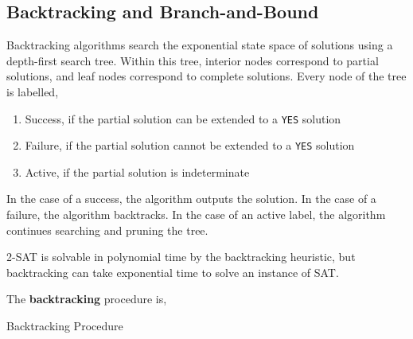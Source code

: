 \subsection{Backtracking and Branch-and-Bound}
Backtracking algorithms search the exponential state space of solutions using a depth-first search tree. Within this tree, interior nodes correspond to partial solutions, and leaf nodes correspond to complete solutions. Every node of the tree is labelled,
\begin{enumerate}
	\item Success, if the partial solution can be extended to a \texttt{YES} solution
	\item Failure, if the partial solution cannot be extended to a \texttt{YES} solution
	\item Active, if the partial solution is indeterminate
\end{enumerate}
In the case of a success, the algorithm outputs the solution. In the case of a failure, the algorithm backtracks. In the case of an active label, the algorithm continues searching and pruning the tree.

\begin{marginfigure}
	2-SAT is solvable in polynomial time by the backtracking heuristic, but backtracking can take exponential time to solve an instance of SAT.
\end{marginfigure}

 \begin{defn}[Backtracking]
 	The \textbf{backtracking} procedure is,
 	\begin{algorithm}
	  \caption{Backtracking Procedure}\label{backtracking}
\end{algorithm}
\end{defn}

